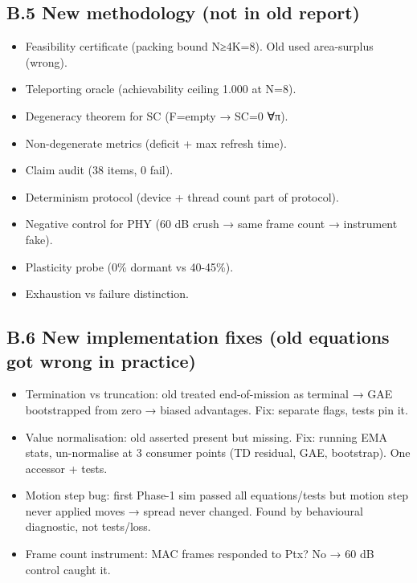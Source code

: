 \documentclass[10pt]{article}
\begin{document}
\subsection{B.5 New methodology (not in old report)}
\begin{itemize}
\item Feasibility certificate (packing bound N≥4K=8). Old used area-surplus (wrong).
\item Teleporting oracle (achievability ceiling 1.000 at N=8).
\item Degeneracy theorem for SC (F=empty → SC=0 ∀π).
\item Non-degenerate metrics (deficit + max refresh time).
\item Claim audit (38 items, 0 fail).
\item Determinism protocol (device + thread count part of protocol).
\item Negative control for PHY (60 dB crush → same frame count → instrument fake).
\item Plasticity probe (0\% dormant vs 40-45\%).
\item Exhaustion vs failure distinction.
\end{itemize}

\subsection{B.6 New implementation fixes (old equations got wrong in practice)}
\begin{itemize}
\item Termination vs truncation: old treated end-of-mission as terminal → GAE bootstrapped from zero → biased advantages. Fix: separate flags, tests pin it.
\item Value normalisation: old asserted present but missing. Fix: running EMA stats, un-normalise at 3 consumer points (TD residual, GAE, bootstrap). One accessor + tests.
\item Motion step bug: first Phase-1 sim passed all equations/tests but motion step never applied moves → spread never changed. Found by behavioural diagnostic, not tests/loss.
\item Frame count instrument: MAC frames responded to Ptx? No → 60 dB control caught it.
\end{itemize}
\end{document}
